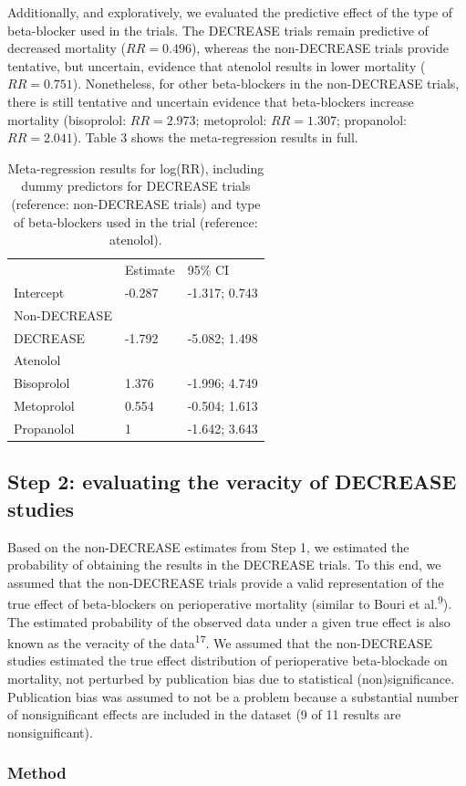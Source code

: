 \documentclass[]{article}
\begin{document}
Additionally, and exploratively, we evaluated the predictive effect of
the type of beta-blocker used in the trials. The DECREASE trials remain
predictive of decreased mortality (\(RR=0.496\)), whereas the
non-DECREASE trials provide tentative, but uncertain, evidence that
atenolol results in lower mortality (\(RR=0.751\)). Nonetheless, for
other beta-blockers in the non-DECREASE trials, there is still tentative
and uncertain evidence that beta-blockers increase mortality
(bisoprolol: \(RR=2.973\); metoprolol: \(RR=1.307\); propanolol:
\(RR=2.041\)). Table 3 shows the meta-regression results in full.

\begin{longtable}[]{@{}lll@{}}
\caption{Meta-regression results for log(RR), including dummy predictors
for DECREASE trials (reference: non-DECREASE trials) and type of
beta-blockers used in the trial (reference: atenolol).}\tabularnewline
\toprule
& Estimate & 95\% CI\tabularnewline
Intercept & -0.287 & -1.317; 0.743\tabularnewline
Non-DECREASE & &\tabularnewline
DECREASE & -1.792 & -5.082; 1.498\tabularnewline
Atenolol & &\tabularnewline
Bisoprolol & 1.376 & -1.996; 4.749\tabularnewline
Metoprolol & 0.554 & -0.504; 1.613\tabularnewline
Propanolol & 1 & -1.642; 3.643\tabularnewline
\bottomrule
\end{longtable}

\subsection{Step 2: evaluating the veracity of DECREASE
studies}\label{step-2-evaluating-the-veracity-of-decrease-studies}

Based on the non-DECREASE estimates from Step 1, we estimated the
probability of obtaining the results in the DECREASE trials. To this
end, we assumed that the non-DECREASE trials provide a valid
representation of the true effect of beta-blockers on perioperative
mortality (similar to Bouri et al.\textsuperscript{9}). The estimated
probability of the observed data under a given true effect is also known
as the veracity of the data\textsuperscript{17}. We assumed that the
non-DECREASE studies estimated the true effect distribution of
perioperative beta-blockade on mortality, not perturbed by publication
bias due to statistical (non)significance. Publication bias was assumed
to not be a problem because a substantial number of nonsignificant
effects are included in the dataset (9 of 11 results are
nonsignificant).

\subsubsection{Method}\label{method}
\end{document}
